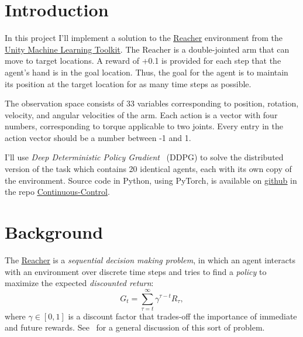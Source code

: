 \documentclass[sigchi]{acmart}
\begin{document}
\section{Introduction}

In this project I'll implement a solution to the 
\href{https://github.com/Unity-Technologies/ml-agents/blob/master/docs/Learning-Environment-Examples.md#reacher}{\underline{Reacher}}
environment from the 
\href{https://unity3d.ai}{\underline{Unity Machine Learning Toolkit}}.
The Reacher is a double-jointed arm that can move to target locations. A reward of +0.1 is provided for each step 
that the agent's hand is in the goal location. Thus, the goal for the agent is to maintain its position at the target location for as many time steps as possible.

The observation space consists of 33 variables corresponding to position, rotation, velocity, and angular velocities of the arm. Each action is a vector with four numbers, corresponding to torque applicable to two joints. Every entry in the action vector should be a number between -1 and 1.


I'll use {\em Deep Deterministic Policy Gradient}~\cite{Silver:2014:DPG:3044805.3044850} (DDPG) to solve the distributed version of the task which contains 20 identical agents, each with its own copy of the environment.
Source code in Python, using PyTorch, is available on 
\href{http://github.com}{\underline{github}} 
in the repo 
\href{https://github.com/bobflagg/Continuous-Control}{\underline{Continuous-Control}}.





\section{Background}

The 
\href{https://github.com/Unity-Technologies/ml-agents/blob/master/docs/Learning-Environment-Examples.md#reacher}{\underline{Reacher}}
is a {\em sequential decision making problem}, in which an agent interacts with an environment over discrete time
steps and tries to find a {\em policy} to maximize the expected {\em discounted return}:
$$G_t = \sum_{\tau=t}^{\infty}\gamma^{\tau-t}R_\tau,$$
where $\gamma\in[0,1]$  is a discount factor that trades-off the importance of immediate and future rewards.
See~\cite{DBLP:books/lib/SuttonB98} for a general discussion of this sort of problem. 

\end{document}
